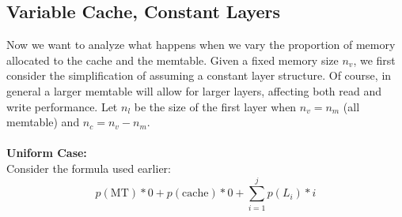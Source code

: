 \documentclass{sig-alternate-05-2015}
\begin{document}
\subsection{Variable Cache, Constant Layers}

Now we want to analyze what happens when we vary the proportion of memory allocated to the cache and the memtable. Given a fixed memory size $n_v$, we first consider the simplification of assuming a constant layer structure. Of course, in general a larger memtable will allow for larger layers, affecting both read and write performance. Let $n_l$ be the size of the first layer when $n_v = n_m$ (all memtable) and $n_c =n_v - n_m$.\\ \\
\textbf{Uniform Case:} \\
Consider the formula used earlier:
$$
p(\text{MT}) * 0  + p(\text{cache}) * 0 + \sum_{i=1}^j p(L_i) * i 
$$
\end{document}
